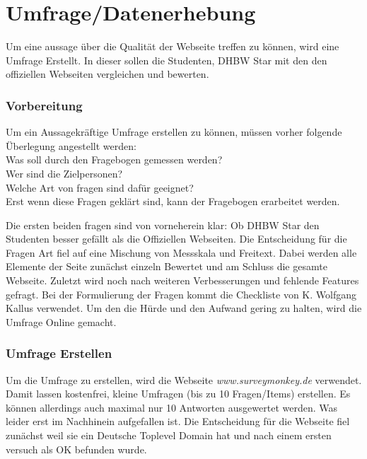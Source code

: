 \chapter{Umfrage/Datenerhebung}
Um eine aussage über die Qualität der Webseite treffen zu können, wird eine Umfrage Erstellt. In dieser sollen die Studenten, DHBW Star mit den den offiziellen Webseiten vergleichen und bewerten.

\subsection{Vorbereitung}
Um ein Aussagekräftige Umfrage erstellen zu können, müssen vorher folgende Überlegung angestellt werden:\\
Was soll durch den Fragebogen gemessen werden?\\
Wer sind die Zielpersonen?\\
Welche Art von fragen sind dafür geeignet?\\
Erst wenn diese Fragen geklärt sind, kann der Fragebogen erarbeitet werden.

Die ersten beiden fragen sind von vorneherein klar:
Ob DHBW Star den Studenten besser gefällt als die Offiziellen Webseiten.
Die Entscheidung für die Fragen Art fiel auf eine Mischung von Messskala und Freitext.
Dabei werden alle Elemente der Seite zunächst einzeln Bewertet und am Schluss die gesamte Webseite.
Zuletzt wird noch nach weiteren Verbesserungen und fehlende Features gefragt.
Bei der Formulierung der Fragen kommt die Checkliste von K. Wolfgang Kallus verwendet.
Um den die Hürde und den Aufwand gering zu halten, wird die Umfrage Online gemacht.

\subsection{Umfrage Erstellen}
Um die Umfrage zu erstellen, wird die Webseite \emph{www.surveymonkey.de} verwendet. Damit lassen kostenfrei, kleine Umfragen (bis zu 10 Fragen/Items) erstellen. Es können allerdings auch maximal nur 10 Antworten ausgewertet werden. Was leider erst im Nachhinein aufgefallen ist.
Die Entscheidung für die Webseite fiel zunächst weil sie ein Deutsche Toplevel Domain hat und nach einem ersten versuch als OK befunden wurde.

